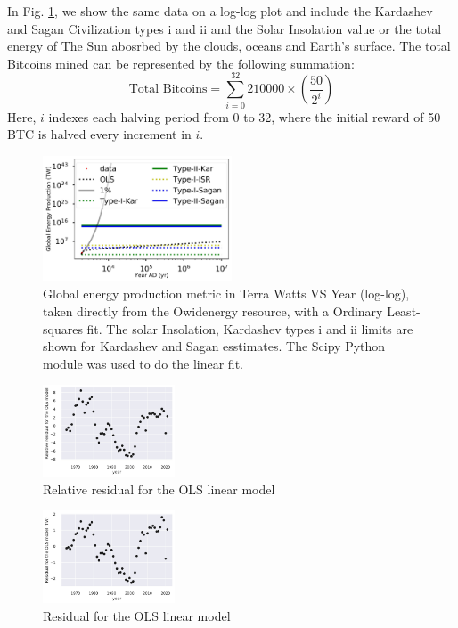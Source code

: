 \documentclass[final,5p,times,twocolumn,authoryear]{elsarticle}
\begin{document}
In Fig. \ref{fig:kardashev3}, we show the same data on a log-log plot and include the Kardashev and Sagan Civilization types i and ii and the Solar Insolation value or the total energy of The Sun abosrbed by the clouds, oceans and Earth's surface. %
The total Bitcoins mined can be represented by the following summation:
\[
\textrm{Total Bitcoins} = \sum_{i=0}^{32} 210000 \times \left(\frac{50}{2^i}\right)
\]
Here, \( i \) indexes each halving period from 0 to 32, where the initial reward of 50 BTC is halved every increment in \( i \).

\begin{figure}
    \centering
    \includegraphics[width=0.5\textwidth]{figs/fig2_kar.jpg}
    \caption{Global energy production metric in Terra Watts VS Year (log-log), taken directly from the Owidenergy resource, with a Ordinary Least-squares fit. The solar Insolation, Kardashev types i and ii limits are shown for Kardashev and Sagan esstimates. The Scipy Python module was used to do the linear fit.}
    \label{fig:kardashev3}

\end{figure}

\begin{figure}
    \centering
    \includegraphics[width=0.35\textwidth]{figs/fig1p_kar_rel_res.jpg}
    \caption{Relative residual for the OLS
    linear model}
    \label{fig:kardashev1_rel_res}

\end{figure}

\begin{figure}
    \centering
    \includegraphics[width=0.35\textwidth]{figs/fig1p_kar_res.jpg}
    \caption{Residual for the OLS
    linear model}
    \label{fig:kardashev1_res}

\end{figure}
\end{document}
